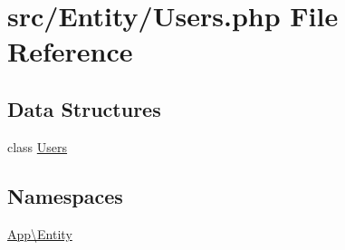 \hypertarget{_users_8php}{}\section{src/\+Entity/\+Users.php File Reference}
\label{_users_8php}
\subsection*{Data Structures}
\begin{DoxyCompactItemize}
\item 
class \mbox{\hyperlink{class_app_1_1_entity_1_1_users}{Users}}
\end{DoxyCompactItemize}
\subsection*{Namespaces}
\begin{DoxyCompactItemize}
\item 
 \mbox{\hyperlink{namespace_app_1_1_entity}{App\textbackslash{}\+Entity}}
\end{DoxyCompactItemize}
